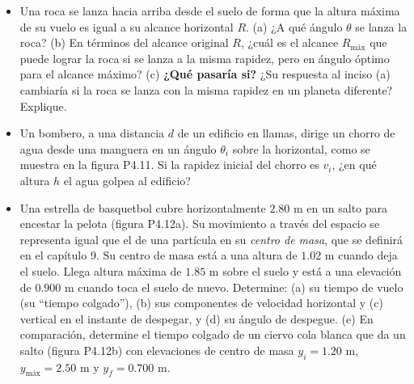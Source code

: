 \documentclass[11pt,a4paper]{article}
\begin{document}
\begin{itemize}
    \item[\textbf{10.}] Una roca se lanza hacia arriba desde el suelo de forma que la altura máxima de su vuelo es igual a su alcance horizontal $R$. (a) ¿A qué ángulo $\theta$ se lanza la roca? (b) En términos del alcance original $R$, ¿cuál es el alcance $R_{\text{máx}}$ que puede lograr la roca si se lanza a la misma rapidez, pero en ángulo óptimo para el alcance máximo? (c) \textbf{¿Qué pasaría si?} ¿Su respuesta al inciso (a) cambiaría si la roca se lanza con la misma rapidez en un planeta diferente? Explique.
    \vspace*{6cm}

    \item[\textbf{11.}] Un bombero, a una distancia $d$ de un edificio en llamas, dirige un chorro de agua desde una manguera en un ángulo $\theta_i$ sobre la horizontal, como se muestra en la figura P4.11. Si la rapidez inicial del chorro es $v_i$, ¿en qué altura $h$ el agua golpea al edificio?
    \vspace*{6cm}

    \item[\textbf{12.}] Una estrella de basquetbol cubre horizontalmente $2.80 \text{ m}$ en un salto para encestar la pelota (figura P4.12a). Su movimiento a través del espacio se representa igual que el de una partícula en su \textit{centro de masa}, que se definirá en el capítulo 9. Su centro de masa está a una altura de $1.02 \text{ m}$ cuando deja el suelo. Llega altura máxima de $1.85 \text{ m}$ sobre el suelo y está a una elevación de $0.900 \text{ m}$ cuando toca el suelo de nuevo. Determine: (a) su tiempo de vuelo (su ``tiempo colgado''), (b) sus componentes de velocidad horizontal y (c) vertical en el instante de despegar, y (d) su ángulo de despegue. (e) En comparación, determine el tiempo colgado de un ciervo cola blanca que da un salto (figura P4.12b) con elevaciones de centro de masa $y_i = 1.20 \text{ m}$, $y_{\text{máx}} = 2.50 \text{ m}$ y $y_f = 0.700 \text{ m}$.
    \vspace*{8cm}
\end{itemize}

\newpage
\end{document}
